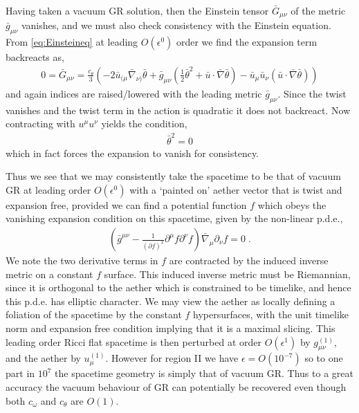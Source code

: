 \documentclass[12pt]{article}
\numberwithin{equation}{section}
\begin{document}
Having taken a vacuum GR solution, then the Einstein tensor $\bar{G}_{\mu\nu}$ of the metric $\bar{g}_{\mu\nu}$ vanishes, and we must also check consistency with the Einstein equation. From \eqref{eq:Einsteineq} at leading $O(\epsilon^0)$ order we find the expansion term backreacts as,
\begin{eqnarray}
0 = \bar{G}_{\mu\nu} = \frac{c_\theta}{3} \left( - 2 \bar{u}_{(\mu} \bar{\nabla}_{\nu)} \bar{\theta} + \bar{g}_{\mu\nu} \left( \frac{1}{2} \bar{\theta}^2 + \bar{u} \cdot \bar{\nabla} \bar{\theta} \right) -  \bar{u}_\mu \bar{u}_\nu ( \bar{u} \cdot \bar{\nabla} \bar{\theta} ) \right)
\end{eqnarray}
and again indices are raised/lowered with the leading metric $\bar{g}_{\mu\nu}$.
Since the twist vanishes and the twist term in the action is quadratic it does not backreact. Now contracting with $u^\mu u^\nu$ yields the condition,
\begin{eqnarray}
\bar{\theta}^2 = 0
\end{eqnarray}
which in fact forces the expansion to vanish for consistency. 

Thus we see that we may consistently take the spacetime to be that of vacuum GR at leading order $O(\epsilon^0)$ with a `painted on' aether vector that is twist and expansion free, provided we can find a potential function $f$ which obeys the vanishing expansion condition on this spacetime, given by the non-linear p.d.e.,
\begin{eqnarray}
\label{eq:aetherRegion2}
\left( \bar{g}^{\mu\nu} - \frac{1}{({\partial} f)^2} \partial^\mu f  {\partial}^\nu f \right) \bar{\nabla}_\mu \partial_\nu f  = 0 \; .
\end{eqnarray}
We note the two derivative terms in $f$ are contracted by the induced inverse metric on a constant $f$ surface. This induced inverse metric must be Riemannian, since it is orthogonal to the aether which is constrained to be timelike, and hence this p.d.e. has elliptic character.  
We may view the aether as locally defining a foliation of the spacetime by the constant $f$ hypersurfaces, with the unit timelike norm and expansion free condition implying that it is a maximal slicing.
This leading order Ricci flat spacetime is then perturbed at order $O(\epsilon^1)$ by $g^{(1)}_{\mu\nu}$, and the aether by $u^{(1)}_\mu$. However 
for region II we have $\epsilon = O(10^{-7})$ so 
to one part in $10^7$ the spacetime geometry is simply that of vacuum GR. Thus to a great accuracy the vacuum behaviour of GR can potentially be recovered even though both $c_\omega$ and $c_\theta$ are $O(1)$. 
\end{document}
